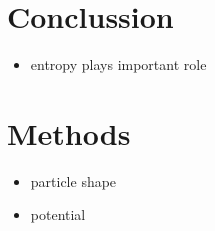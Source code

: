 \documentclass[epj,onecolumn]{webofc}
\begin{document}
\section{Conclussion}
\label{sec:Conclussion}

\begin{itemize}
    \item entropy plays important role
\end{itemize}

\section{Methods}
\label{sec:Methods}

\begin{itemize}
    \item particle shape
    \item potential
\end{itemize}
\end{document}
